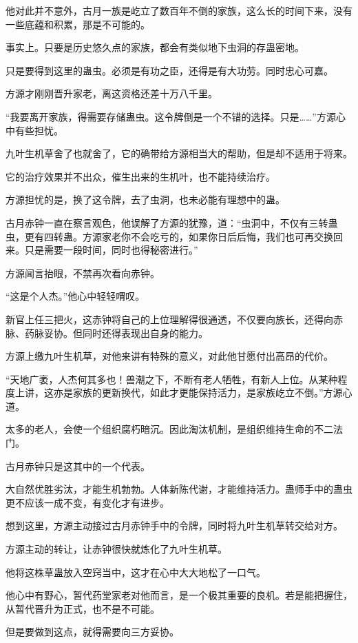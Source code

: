 \begin{this_body}
他对此并不意外，古月一族是屹立了数百年不倒的家族，这么长的时间下来，没有一些底蕴和积累，那是不可能的。

事实上。只要是历史悠久点的家族，都会有类似地下虫洞的存蛊密地。

只是要得到这里的蛊虫。必须是有功之臣，还得是有大功劳。同时忠心可嘉。

方源才刚刚晋升家老，离这资格还差十万八千里。

“我要离开家族，得需要存储蛊虫。这令牌倒是一个不错的选择。只是……”方源心中有些担忧。

九叶生机草舍了也就舍了，它的确带给方源相当大的帮助，但是却不适用于将来。

它的治疗效果并不出众，催生出来的生机叶，也不能持续治疗。

方源担忧的是，换了这令牌，去了虫洞，也未必能有理想中的蛊。

古月赤钟一直在察言观色，他误解了方源的犹豫，道：“虫洞中，不仅有三转蛊虫，更有四转蛊。方源家老你不会吃亏的，如果你日后后悔，我们也可再交换回来。只是需要一段时间，同时也得秘密进行。”

方源闻言抬眼，不禁再次看向赤钟。

“这是个人杰。”他心中轻轻喟叹。

新官上任三把火，这赤钟将自己的上位理解得很通透，不仅要向族长，还得向赤脉、药脉妥协。但同时还得表现出自身的能力。

方源上缴九叶生机草，对他来讲有特殊的意义，对此他甘愿付出高昂的代价。

“天地广袤，人杰何其多也！兽潮之下，不断有老人牺牲，有新人上位。从某种程度上讲，这亦是家族的更新换代，如此才更能保持活力，是家族屹立不倒。”方源心道。

太多的老人，会使一个组织腐朽暗沉。因此淘汰机制，是组织维持生命的不二法门。

古月赤钟只是这其中的一个代表。

大自然优胜劣汰，才能生机勃勃。人体新陈代谢，才能维持活力。蛊师手中的蛊虫更不应该一成不变，有变化才有进步。

想到这里，方源主动接过古月赤钟手中的令牌，同时将九叶生机草转交给对方。

方源主动的转让，让赤钟很快就炼化了九叶生机草。

他将这株草蛊放入空窍当中，这才在心中大大地松了一口气。

他心中有野心，暂代药堂家老对他而言，是一个极其重要的良机。若是能把握住，从暂代晋升为正式，也不是不可能。

但是要做到这点，就得需要向三方妥协。


\end{this_body}
